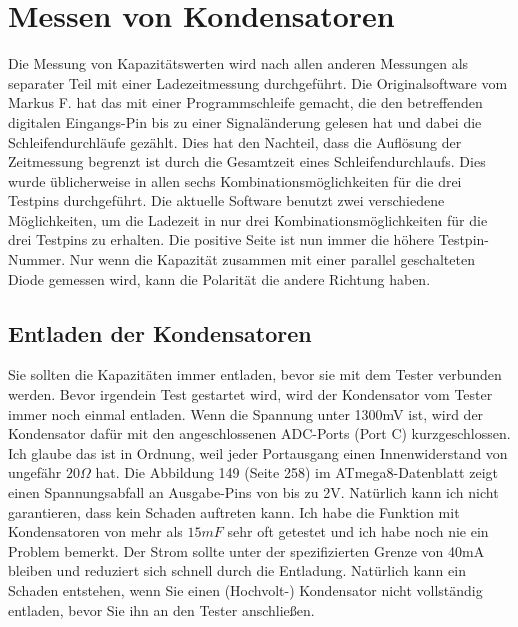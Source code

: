 \section{Messen von Kondensatoren}
Die Messung von Kapazitätswerten wird nach allen anderen Messungen als separater Teil mit einer Ladezeitmessung 
durchgeführt.
Die Originalsoftware vom Markus F. hat das mit einer Programmschleife gemacht, die den betreffenden digitalen
Eingangs-Pin bis zu einer Signaländerung gelesen hat und dabei die Schleifendurchläufe gezählt.
Dies hat den Nachteil, dass die Auflösung der Zeitmessung begrenzt ist durch die Gesamtzeit eines Schleifendurchlaufs.
Dies wurde üblicherweise in allen sechs Kombinationsmöglichkeiten für die drei Testpins durchgeführt.
Die aktuelle Software benutzt zwei verschiedene Möglichkeiten, um die Ladezeit in nur drei
Kombinationsmöglichkeiten für die drei Testpins zu erhalten.
Die positive Seite ist nun immer die höhere Testpin-Nummer.
Nur wenn die Kapazität zusammen mit einer parallel geschalteten Diode gemessen wird,
kann die Polarität die andere Richtung haben.

\subsection{Entladen der Kondensatoren}
Sie sollten die Kapazitäten immer entladen, bevor sie mit dem Tester verbunden werden.
Bevor irgendein Test gestartet wird, wird der Kondensator vom Tester immer noch einmal entladen.
Wenn die Spannung unter 1300mV ist, wird der Kondensator dafür mit den angeschlossenen ADC-Ports (Port C) kurzgeschlossen.
Ich glaube das ist in Ordnung, weil jeder Portausgang einen Innenwiderstand von ungefähr \(20\Omega\) hat.
Die Abbildung 149 (Seite 258) im ATmega8-Datenblatt \cite{ATmega8} zeigt einen Spannungsabfall an Ausgabe-Pins von bis zu 2V.
Natürlich kann ich nicht garantieren, dass kein Schaden auftreten kann.
Ich habe die Funktion mit Kondensatoren von mehr als \(15 mF\) sehr oft getestet und ich habe noch nie ein Problem bemerkt.
Der Strom sollte unter der spezifizierten Grenze von 40mA bleiben und reduziert sich schnell durch die Entladung.
Natürlich kann ein Schaden entstehen, wenn Sie einen (Hochvolt-) Kondensator nicht vollständig entladen, bevor Sie ihn an den Tester anschließen.


